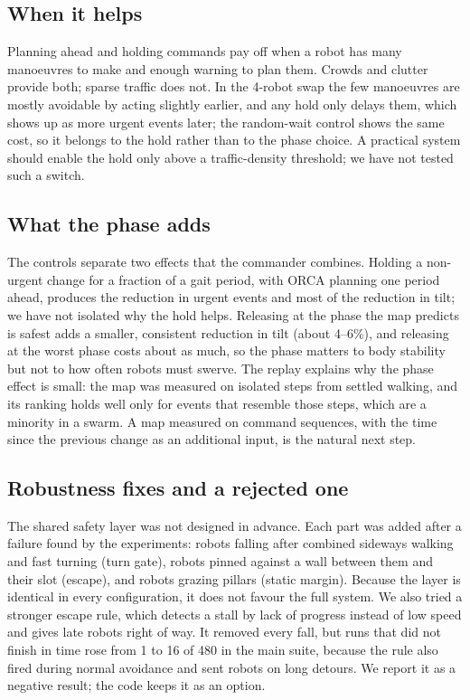 \documentclass[pdflatex,sn-mathphys-num]{sn-jnl}
\begin{document}
\subsection{When it helps}
Planning ahead and holding commands pay off when a robot has many manoeuvres to make and enough warning to
plan them. Crowds and clutter provide both; sparse traffic does not. In the 4-robot swap the few manoeuvres are
mostly avoidable by acting slightly earlier, and any hold only delays them, which shows up as more urgent
events later; the random-wait control shows the same cost, so it belongs to the hold rather than to the phase
choice. A practical system should enable the hold only above a traffic-density threshold; we have not tested
such a switch.

\subsection{What the phase adds}
The controls separate two effects that the commander combines. Holding a non-urgent change for a fraction of a
gait period, with ORCA planning one period ahead, produces the reduction in urgent events and most of the
reduction in tilt; we have not isolated why the hold helps. Releasing at the phase the map predicts is safest
adds a smaller, consistent reduction in tilt (about 4--6\%), and releasing at the worst phase costs about as
much, so the phase matters to body stability but not to how often robots must swerve. The replay explains why
the phase effect is small: the map was measured on isolated steps from settled walking, and its ranking holds
well only for events that resemble those steps, which are a minority in a swarm. A map measured on command
sequences, with the time since the previous change as an additional input, is the natural next step.

\subsection{Robustness fixes and a rejected one}
The shared safety layer was not designed in advance. Each part
was added after a failure found by the experiments: robots falling after combined sideways walking and fast
turning (turn gate), robots pinned against a wall between them and their slot (escape), and robots grazing
pillars (static margin). Because the layer is identical in every configuration, it does not favour the full
system. We also tried a stronger escape rule, which detects a stall by lack of progress instead of low speed
and gives late robots right of way. It removed every fall, but runs that did not finish in time rose from 1 to
16 of 480 in the main suite, because the rule also fired during normal avoidance and sent robots on long
detours. We report it as a negative result; the code keeps it as an option.
\end{document}
